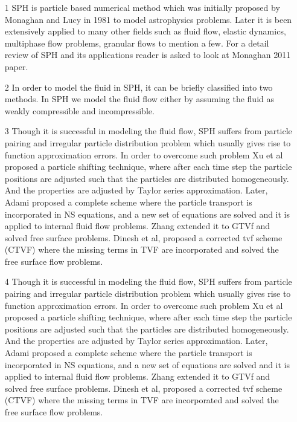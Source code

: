 \documentclass[10pt, conference]{FMFP2022}
\begin{document}
\begin{itemize}
\item [1] SPH is particle based numerical method which was initially proposed by
  Monaghan and Lucy in 1981 to model astrophysics problems. Later it is been
  extensively applied to many other fields such as fluid flow, elastic dynamics,
  multiphase flow problems, granular flows to mention a few. For a detail review
  of SPH and its applications reader is asked to look at Monaghan 2011 paper.
\item [2] In order to model the fluid in SPH, it can be briefly classified into
  two methods. In SPH we model the fluid flow either by assuming the fluid
  as weakly compressible and incompressible.
\item [3] Though it is successful in modeling the fluid flow, SPH suffers from
  particle pairing and irregular particle distribution problem which usually
  gives rise to function approximation errors. In order to overcome such problem
  Xu et al proposed a particle shifting technique, where after each time step
  the particle positions are adjusted such that the particles are distributed
  homogeneously. And the properties are adjusted by Taylor series approximation.
  Later, Adami proposed a complete scheme where the particle transport is
  incorporated in NS equations, and a new set of equations are solved and it is
  applied to internal fluid flow problems. Zhang extended it to GTVf and solved
  free surface problems. Dinesh et al, proposed a corrected tvf scheme (CTVF)
  where the missing terms in TVF are incorporated and solved the free surface
  flow problems.
\item [4] Though it is successful in modeling the fluid flow, SPH suffers from
  particle pairing and irregular particle distribution problem which usually
  gives rise to function approximation errors. In order to overcome such problem
  Xu et al proposed a particle shifting technique, where after each time step
  the particle positions are adjusted such that the particles are distributed
  homogeneously. And the properties are adjusted by Taylor series approximation.
  Later, Adami proposed a complete scheme where the particle transport is
  incorporated in NS equations, and a new set of equations are solved and it is
  applied to internal fluid flow problems. Zhang extended it to GTVf and solved
  free surface problems. Dinesh et al, proposed a corrected tvf scheme (CTVF)
  where the missing terms in TVF are incorporated and solved the free surface
  flow problems.
\end{itemize}
\end{document}
